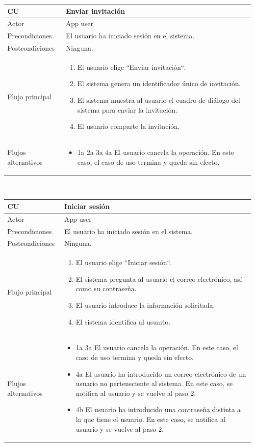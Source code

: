 \documentclass[twoside]{report}
\newcommand\addrow[2]{#1 &#2\\ }
\newcommand\addheading[2]{#1 &#2\\ \hline}
\newcommand\tabularhead{\begin{tabular}{lp{0.7\textwidth}}
\hline
}
\newenvironment{usecase}{\tabularhead}
{\hline\end{tabular}}
\begin{document}
\begin{usecase}
  \addheading{\textbf{CU\arabic{usecase}}}{Enviar invitación} 
  \addrow{Actor}{App user}
  \addrow{Precondiciones}{El usuario ha iniciado sesión en el sistema.}
  \addrow{Postcondiciones}{Ninguna.}
  \addrow{Flujo principal}{
  		\begin{enumerate}
  		\item El usuario elige “Enviar invitación“.
  		\item El sistema genera un identificador único de invitación.
  		\item El sistema muestra al usuario el cuadro de diálogo del sistema para enviar la invitación.
  		\item El usuario comparte la invitación.
  		\end{enumerate}
  }
  \addrow{Flujos alternativos}{
  		\begin{itemize}
  		\item 1a 2a 3a 4a El usuario cancela la operación. En este caso, el caso de uso termina y queda sin efecto.
  		\end{itemize}
  }
\end{usecase}\\

\begin{usecase}
  \addheading{\textbf{CU\arabic{usecase}}}{Iniciar sesión} 
  \addrow{Actor}{App user}
  \addrow{Precondiciones}{El usuario ha iniciado sesión en el sistema.}
  \addrow{Postcondiciones}{Ninguna.}
  \addrow{Flujo principal}{
  		\begin{enumerate}
  		\item El usuario elige “Iniciar sesión“. %
  		\item El sistema pregunta al usuario el correo electrónico, así como su contraseña. %
  		\item El usuario introduce la información solicitada. %
  		\item El sistema identifica al usuario. %
  		\end{enumerate}
  }
  \addrow{Flujos alternativos}{
  		\begin{itemize}
  		\item 1a 3a El usuario cancela la operación. En este caso, el caso de uso termina y queda sin efecto.
  		\item 4a El usuario ha introducido un correo electrónico de un usuario no perteneciente al sistema. En este caso, se notifica al usuario y se vuelve al paso 2.
  		\item 4b El usuario ha introducido una contraseña distinta a la que tiene el usuario. En este caso, se notifica al usuario y se vuelve al paso 2.
  		\end{itemize}
  }
\end{usecase}\\
\end{document}
